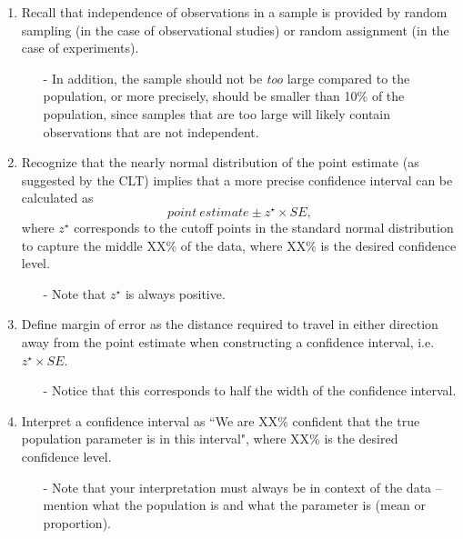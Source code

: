 \documentclass[11pt]{article}
\begin{document}
\begin{enumerate}[resume]
\item Recall that independence of observations in a sample is provided by random sampling (in the case of observational studies) or random assignment (in the case of experiments).
\begin{itemize}
\item[-] In addition, the sample should not be \textit{too} large compared to the population, or more precisely, should be smaller than 10\% of the population, since samples that are too large will likely contain observations that are not independent.
\end{itemize}

\item Recognize that the nearly normal distribution of the point estimate (as suggested by the CLT) implies that a more precise confidence interval can be calculated as
\[ point~estimate \pm z^{\star} \times SE, \] 
where $z^{\star}$ corresponds to the cutoff points in the standard normal distribution to capture the middle XX\% of the data, where XX\% is the desired confidence level.
\begin{itemize}
\item[-] Note that $z^{\star}$ is always positive.
\end{itemize}

\item Define margin of error as the distance required to travel in either direction away from the point estimate when constructing a confidence interval, i.e. $z^{\star} \times SE$.
\begin{itemize}
\item[-] Notice that this corresponds to half the width of the confidence interval.
\end{itemize}

\item Interpret a confidence interval as ``We are XX\% confident that the true population parameter is in this interval", where XX\% is the desired confidence level.
\begin{itemize}
\item[-] Note that your interpretation must always be in context of the data -- mention what the population is and what the parameter is (mean or proportion).
\end{itemize}


\end{enumerate}
\end{document}
